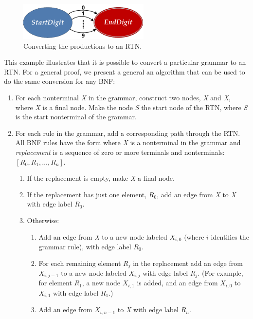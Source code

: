 {\begin{figure}[!htbp]
\begin{center}
\includegraphics[height=0.75in]{figures/convert-rtn-digit.pdf}
\end{center}
\caption{Converting the  productions to an RTN.}\label{fig:convert-digit}
\end{figure}

This example illustrates that it is possible to convert a particular grammar to an RTN.  For a general proof, we present a general an algorithm that can be used to do the same conversion for any BNF:

\begin{enumerate}
\item For each nonterminal \emph{X} in the grammar, construct two nodes, \emph{X} and \emph{X}, where \emph{X} is a final node.  Make the node \emph{S} the start node of the RTN, where \emph{S} is the start nonterminal of the grammar.
\item For each rule in the grammar, add a corresponding path through the RTN.  All BNF rules have the form  where \emph{X} is a nonterminal in the grammar and \emph{replacement} is a sequence of zero or more terminals and nonterminals: $\left[ R_0, R_1, \ldots, R_n \right]$.  
\begin{enumerate}
\item If the replacement is empty, make \emph{X} a final node.
\item If the replacement has just one element, $R_0$, add an edge from \emph{X} to \emph{X} with edge label $R_0$. 
\item Otherwise:
\begin{enumerate}
\item Add an edge from \emph{X} to a new node labeled $X_{i,0}$ (where $i$ identifies the grammar rule), with edge label $R_0$.
\item For each remaining element $R_j$ in the replacement add an edge from $X_{i,j-1}$ to a new node labeled $X_{i,j}$ with edge label $R_j$.  (For example, for element $R_1$, a new node $X_{i,1}$ is added, and an edge from $X_{i,0}$ to $X_{i,1}$ with edge label $R_1$.)
\item Add an edge from $X_{i,n-1}$ to \emph{X} with edge label $R_n$.
\end{enumerate}
\end{enumerate}
\end{enumerate}

}

